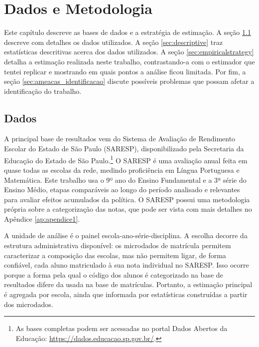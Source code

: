 \chapter{Dados e Metodologia} \label{sec:methodsanddata}

Este capítulo descreve as bases de dados e a estratégia de estimação. A seção \ref{sec:data} descreve com detalhes os dados utilizados. A seção \ref{sec:descriptive} traz estatísticas descritivas acerca dos dados utilizados. A seção \ref{sec:empiricalstrategy} detalha a estimação realizada neste trabalho, contrastando-a com o estimador que tentei replicar e mostrando em quais pontos a análise ficou limitada. Por fim, a seção \ref{sec:ameacas_identificacao} discute possíveis problemas que possam afetar a identificação do trabalho.

\section{Dados} \label{sec:data}

A principal base de resultados vem do Sistema de Avaliação de Rendimento Escolar do Estado de São Paulo (SARESP), disponibilizado pela Secretaria da Educação do Estado de São Paulo.\footnote{As bases completas podem ser acessadas no portal Dados Abertos da Educação: \url{https://dados.educacao.sp.gov.br/}.} O SARESP é uma avaliação anual feita em quase todas as escolas da rede, medindo proficiência em Língua Portuguesa e Matemática. Este trabalho usa o 9º ano do Ensino Fundamental e a 3ª série do Ensino Médio, etapas comparáveis ao longo do período analisado e relevantes para avaliar efeitos acumulados da política. O SARESP possui uma metodologia própria sobre a categorização das notas, que pode ser vista com mais detalhes no Apêndice \ref{ap:apendice1}.

A unidade de análise é o painel escola-ano-série-disciplina. A escolha decorre da estrutura administrativa disponível: os microdados de matrícula permitem caracterizar a composição das escolas, mas não permitem ligar, de forma confiável, cada aluno matriculado à sua nota individual no SARESP. Isso ocorre porque a forma pela qual o código dos alunos é categorizado na base de resultados difere da usada na base de matrículas. Portanto, a estimação principal é agregada por escola, ainda que informada por estatísticas construídas a partir dos microdados.

